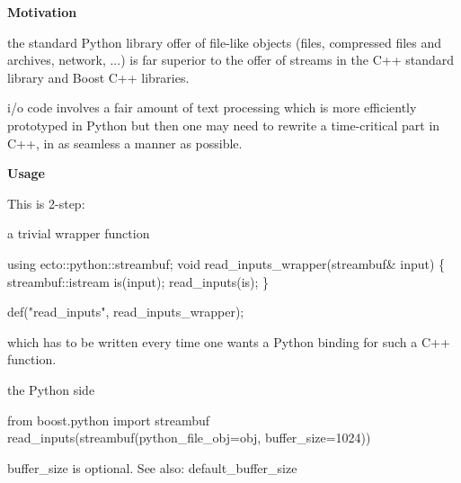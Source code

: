 {\bfseries Motivation} 


\begin{DoxyItemize}
\item the standard Python library offer of file-\/like objects (files, compressed files and archives, network, ...) is far superior to the offer of streams in the C++ standard library and Boost C++ libraries.
\item i/o code involves a fair amount of text processing which is more efficiently prototyped in Python but then one may need to rewrite a time-\/critical part in C++, in as seamless a manner as possible.
\end{DoxyItemize}

{\bfseries Usage} 

This is 2-\/step\-:


\begin{DoxyItemize}
\item a trivial wrapper function
\end{DoxyItemize}


\begin{DoxyCode}
\textcolor{keyword}{using} ecto::python::streambuf;
\textcolor{keywordtype}{void} read\_inputs\_wrapper(streambuf& input)
\{
  streambuf::istream is(input);
  read\_inputs(is);
\}

def(\textcolor{stringliteral}{"read\_inputs"}, read\_inputs\_wrapper);
\end{DoxyCode}


which has to be written every time one wants a Python binding for such a C++ function.


\begin{DoxyItemize}
\item the Python side
\end{DoxyItemize}


\begin{DoxyCode}
from boost.python \textcolor{keyword}{import} streambuf
read\_inputs(streambuf(python\_file\_obj=obj, buffer\_size=1024))
\end{DoxyCode}


{\ttfamily buffer\-\_\-size} is optional. See also\-: {\ttfamily default\-\_\-buffer\-\_\-size} 

